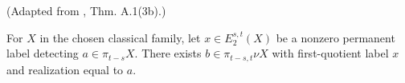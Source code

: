 \begin{theorem}
\label{frontier:Literature:acb86a0972cf}
(Adapted from \cite{BHS}, Thm. A.1(3b).)\par{}

For $X$ in the chosen classical family, let $x\in E_2^{s,t}(X)$ be a nonzero permanent label detecting $a\in\pi_{t-s}X$. There exists $b\in\pi_{t-s,t}\nu X$ with first-quotient label $x$ and realization equal to $a$.
\end{theorem}

